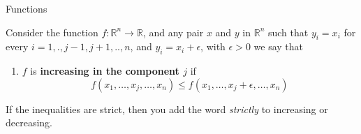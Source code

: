 \documentclass[aspectratio=169]{beamer}
\begin{document}
\begin{frame}{Functions}
    \begin{definition}
        Consider the function $f:\mathds{R}^n\rightarrow\mathds{R}$, and any pair $x$ and $y$ in $\mathds{R}^n$ such that $y_i=x_i$ for every $i=1,.,j-1,j+1,..,n$, and $y_i=x_i+\epsilon$, with $\epsilon>0$ we say that
        \begin{enumerate}
            \item $f$ is \textbf{increasing in the component $j$} if $$f(x_1,\ldots,x_j,\ldots,x_n)\leq f(x_1,\ldots,x_j+\epsilon,\ldots,x_n)$$
        \end{enumerate}
    \end{definition}
    
    If the inequalities are strict, then you add the word \emph{strictly} to increasing or decreasing.
\end{frame}
\end{document}
